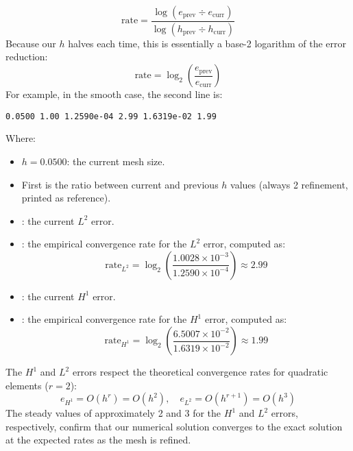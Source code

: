 \begin{equation*}
    \text{rate} = \dfrac{\log\left(e_{\text{prev}} \div e_{\text{curr}}\right)}{\log\left(h_{\text{prev}} \div h_{\text{curr}}\right)}
\end{equation*}
Because our $h$ halves each time, this is essentially a base-2 logarithm of the error reduction:
\begin{equation*}
    \text{rate} = \log_{2}\left(\dfrac{e_{\text{prev}}}{e_{\text{curr}}}\right)
\end{equation*}
For example, in the smooth case, the second line is:
\begin{lstlisting}
0.0500 1.00 1.2590e-04 2.99 1.6319e-02 1.99\end{lstlisting}
Where:
\begin{itemize}
    \item $h = 0.0500$: the current mesh size.
    \item First  is the ratio between current and previous $h$ values (always 2 refinement, printed as reference).
    \item {}: the current $L^2$ error.
    \item {}: the empirical convergence rate for the $L^2$ error, computed as:
    \begin{equation*}
        \text{rate}_{L^2} = \log_{2}\left(\dfrac{1.0028 \times 10^{-3}}{1.2590 \times 10^{-4}}\right) \approx 2.99
    \end{equation*}
    \item {}: the current $H^1$ error.
    \item {}: the empirical convergence rate for the $H^1$ error, computed as:
    \begin{equation*}
        \text{rate}_{H^1} = \log_{2}\left(\dfrac{6.5007 \times 10^{-2}}{1.6319 \times 10^{-2}}\right) \approx 1.99
    \end{equation*}
\end{itemize}
The $H^1$ and $L^2$ errors respect the theoretical convergence rates for quadratic elements ($r=2$):
\begin{equation*}
    e_{H^{1}} = O\left(h^{r}\right) = O\left(h^{2}\right), \quad e_{L^{2}} = O\left(h^{r+1}\right) = O\left(h^{3}\right)
\end{equation*}
The steady values of approximately 2 and 3 for the $H^1$ and $L^2$ errors, respectively, confirm that our numerical solution converges to the exact solution at the expected rates as the mesh is refined.

